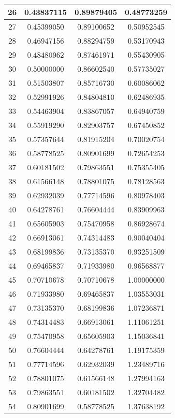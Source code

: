 \documentclass{jsarticle}
\begin{document}
\begin{longtable}{|c|c|c|c|}
	26	&0.43837115	&0.89879405	&0.48773259	\\ \hline
	27	&0.45399050	&0.89100652	&0.50952545	\\ \hline
	28	&0.46947156	&0.88294759	&0.53170943	\\ \hline
	29	&0.48480962	&0.87461971	&0.55430905	\\ \hline
	30	&0.50000000	&0.86602540	&0.57735027	\\ \hline
	31	&0.51503807	&0.85716730	&0.60086062	\\ \hline
	32	&0.52991926	&0.84804810	&0.62486935	\\ \hline
	33	&0.54463904	&0.83867057	&0.64940759	\\ \hline
	34	&0.55919290	&0.82903757	&0.67450852	\\ \hline
	35	&0.57357644	&0.81915204	&0.70020754	\\ \hline
	36	&0.58778525	&0.80901699	&0.72654253	\\ \hline
	37	&0.60181502	&0.79863551	&0.75355405	\\ \hline
	38	&0.61566148	&0.78801075	&0.78128563	\\ \hline
	39	&0.62932039	&0.77714596	&0.80978403	\\ \hline
	40	&0.64278761	&0.76604444	&0.83909963	\\ \hline
	41	&0.65605903	&0.75470958	&0.86928674	\\ \hline
	42	&0.66913061	&0.74314483	&0.90040404	\\ \hline
	43	&0.68199836	&0.73135370	&0.93251509	\\ \hline
	44	&0.69465837	&0.71933980	&0.96568877	\\ \hline
	45	&0.70710678	&0.70710678	&1.00000000	\\ \hline
	46	&0.71933980	&0.69465837	&1.03553031	\\ \hline
	47	&0.73135370	&0.68199836	&1.07236871	\\ \hline
	48	&0.74314483	&0.66913061	&1.11061251	\\ \hline
	49	&0.75470958	&0.65605903	&1.15036841	\\ \hline
	50	&0.76604444	&0.64278761	&1.19175359	\\ \hline
	51	&0.77714596	&0.62932039	&1.23489716	\\ \hline
	52	&0.78801075	&0.61566148	&1.27994163	\\ \hline
	53	&0.79863551	&0.60181502	&1.32704482	\\ \hline
	54	&0.80901699	&0.58778525	&1.37638192	\\ \hline

\end{longtable}
\end{document}
